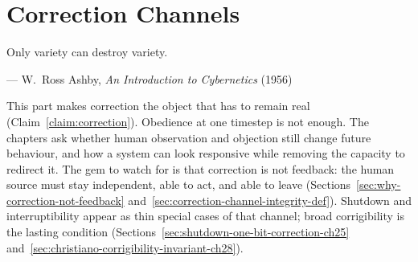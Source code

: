 \part{Correction Channels}

\epigraph{%
Only variety can destroy variety.%
}{--- W.\ Ross Ashby, \emph{An Introduction to Cybernetics} (1956)}

This part makes correction the object that has to remain real (Claim~\ref{claim:correction}).
Obedience at one timestep is not enough.
The chapters ask whether human observation and objection still change future behaviour, and how a system can look responsive while removing the capacity to redirect it.
The gem to watch for is that correction is not feedback: the human source must stay independent, able to act, and able to leave (Sections~\ref{sec:why-correction-not-feedback} and~\ref{sec:correction-channel-integrity-def}).
Shutdown and interruptibility appear as thin special cases of that channel; broad corrigibility is the lasting condition (Sections~\ref{sec:shutdown-one-bit-correction-ch25} and~\ref{sec:christiano-corrigibility-invariant-ch28}).






